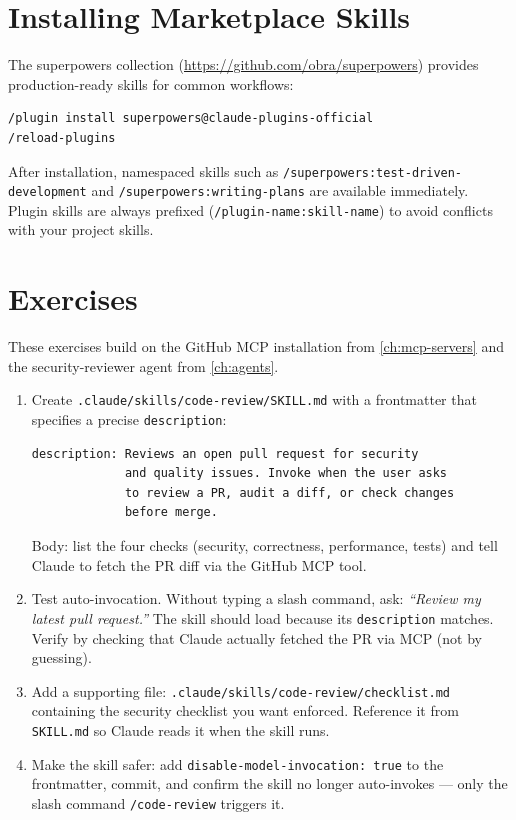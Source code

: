 \section{Installing Marketplace Skills}
\label{sec:skill-marketplace}


The superpowers collection (\url{https://github.com/obra/superpowers}) provides
production-ready skills for common workflows:

\begin{lstlisting}[language=bash,caption={Installing the official superpowers plugin}]
/plugin install superpowers@claude-plugins-official
/reload-plugins
\end{lstlisting}

After installation, namespaced skills such as
\texttt{/superpowers:test-driven-\allowbreak development} and
\texttt{/superpowers:writing-plans} are available immediately. Plugin
skills are always prefixed (\texttt{/plugin-name:skill-name}) to avoid
conflicts with your project skills.

\section{Exercises}
\label{sec:skill-exercises}

\begin{exercisebox}
These exercises build on the GitHub MCP installation from
\cref{ch:mcp-servers} and the security-reviewer agent from
\cref{ch:agents}.

\begin{enumerate}
  \item Create \texttt{.claude/skills/code-review/SKILL.md} with a
        frontmatter that specifies a precise \texttt{description}:
\begin{verbatim}
description: Reviews an open pull request for security
             and quality issues. Invoke when the user asks
             to review a PR, audit a diff, or check changes
             before merge.
\end{verbatim}
        Body: list the four checks (security, correctness, performance,
        tests) and tell Claude to fetch the PR diff via the GitHub MCP
        tool.
  \item Test auto-invocation. Without typing a slash command, ask:
        \emph{``Review my latest pull request.''} The skill should load
        because its \texttt{description} matches. Verify by checking
        that Claude actually fetched the PR via MCP (not by guessing).
  \item Add a supporting file: \texttt{.claude/skills/code-review/checklist.md}
        containing the security checklist you want enforced. Reference
        it from \texttt{SKILL.md} so Claude reads it when the skill
        runs.
  \item Make the skill safer: add
        \texttt{disable-model-invocation: true} to the frontmatter,
        commit, and confirm the skill no longer auto-invokes — only the
        slash command \texttt{/code-review} triggers it.
\end{enumerate}
\end{exercisebox}

